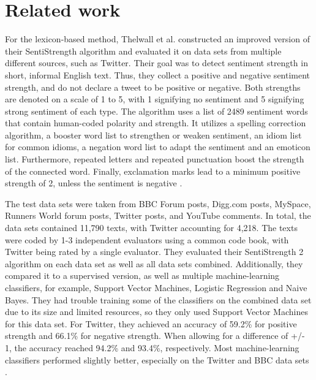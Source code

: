 \chapter{Related work}
\label{cha:Chapter2_RelatedWork}
\iffalse

Length: 1-2 pages

Effort: ~2 weeks

2-3 Arbeiten maximal, die genauer betrachtet werden
Ruhig mehr Zitate --> aber nicht detailliert betrachten
Introduction to Data Mining --> zu generell, nur als Zitat
Hier nur im engsten Sinne


Content
\begin{itemize}
\item Alec Go, Richa Bhayani, and Lei Huang. 2009. Twitter Sentiment Classification Using Distant Supervision.
Technical Report. Standford.
\item Taboada or Serendio or Vader?
\item Khuc et al.
\end{itemize}

\fi

For the lexicon-based method, Thelwall et al. constructed an improved version of their SentiStrength algorithm and evaluated it on data sets from multiple different sources, such as Twitter. Their goal was to detect sentiment strength in short, informal English text. Thus, they collect a positive and negative sentiment strength, and do not declare a tweet to be positive or negative. Both strengths are denoted on a scale of 1 to 5, with 1 signifying no sentiment and 5 signifying strong sentiment of each type. The algorithm uses a list of 2489 sentiment words that contain human-coded polarity and strength. It utilizes a spelling correction algorithm, a booster word list to strengthen or weaken sentiment, an idiom list for common idioms, a negation word list to adapt the sentiment and an emoticon list. Furthermore, repeated letters and repeated punctuation boost the strength of the connected word. Finally, exclamation marks lead to a minimum positive strength of 2, unless the sentiment is negative \cite{10.1002/asi.21662}.

The test data sets were taken from BBC Forum posts, Digg.com posts, MySpace, Runners World forum posts, Twitter posts, and YouTube comments. In total, the data sets contained 11,790 texts, with Twitter accounting for 4,218. The texts were coded by 1-3 independent evaluators using a common code book, with Twitter being rated by a single evaluator. They evaluated their SentiStrength 2 algorithm on each data set as well as all data sets combined. Additionally, they compared it to a supervised version, as well as multiple machine-learning classifiers, for example, Support Vector Machines, Logistic Regression and Naive Bayes. They had trouble training some of the classifiers on the combined data set due to its size and limited resources, so they only used Support Vector Machines for this data set. For Twitter, they achieved an accuracy of 59.2\% for positive strength and 66.1\% for negative strength. When allowing for a difference of +/- 1, the accuracy reached 94.2\% and 93.4\%, respectively. Most machine-learning classifiers performed slightly better, especially on the Twitter and BBC data sets \cite{10.1002/asi.21662}.

